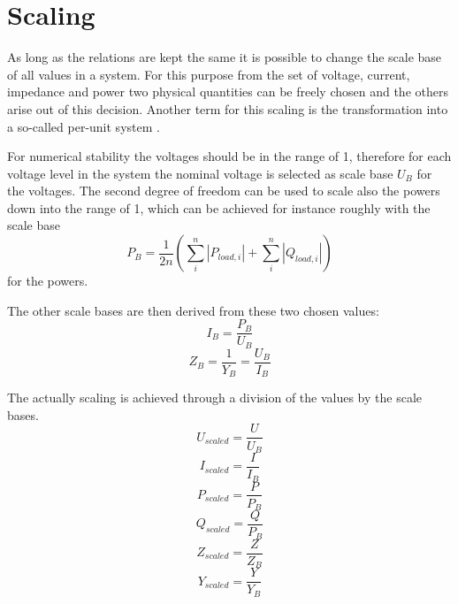 \section{Scaling}

As long as the relations are kept the same it is possible to change the scale base of all values in a system. For this purpose from the set of voltage, current, impedance and power two physical quantities can be freely chosen and the others arise out of this decision. Another term for this scaling is the transformation into a so-called per-unit system \citep[p. 90]{powerSystemAnalysis}.

For numerical stability the voltages should be in the range of 1, therefore for each voltage level in the system the nominal voltage is selected as scale base $U_B$ for the voltages. The second degree of freedom can be used to scale also the powers down into the range of 1, which can be achieved for instance roughly with the scale base
\begin{equation}
	P_B = \frac{1}{2n} \left( \sum_{i}^n \left| P_{load,i} \right| + \sum_{i}^n \left| Q_{load,i} \right| \right)
\end{equation}
for the powers. 

The other scale bases are then derived from these two chosen values:
\begin{equation}
	I_B = \frac{P_B}{U_B}
\end{equation}
\begin{equation}
	Z_B = \frac{1}{Y_B} = \frac{U_B}{I_B}
\end{equation}

The actually scaling is achieved through a division of the values by the scale bases.
\begin{equation}
	U_{scaled} = \frac{U}{U_B}
\end{equation}
\begin{equation}
	I_{scaled} = \frac{I}{I_B}
\end{equation}
\begin{equation}
	P_{scaled} = \frac{P}{P_B}
\end{equation}
\begin{equation}
	Q_{scaled} = \frac{Q}{P_B}
\end{equation}
\begin{equation}
	Z_{scaled} = \frac{Z}{Z_B}
\end{equation}
\begin{equation}
	Y_{scaled} = \frac{Y}{Y_B}
	\label{eq:scaling_admittance}
\end{equation}

